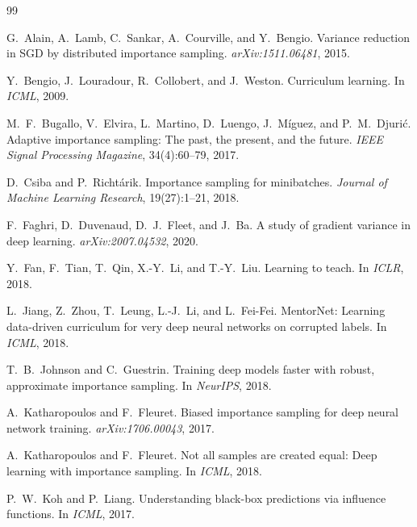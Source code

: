 \documentclass[11pt]{article}
\begin{document}
\begin{thebibliography}{99}

G.~Alain, A.~Lamb, C.~Sankar, A.~Courville, and Y.~Bengio.
\newblock Variance reduction in SGD by distributed importance sampling.
\newblock \emph{arXiv:1511.06481}, 2015.

Y.~Bengio, J.~Louradour, R.~Collobert, and J.~Weston.
\newblock Curriculum learning.
\newblock In \emph{ICML}, 2009.

M.~F.~Bugallo, V.~Elvira, L.~Martino, D.~Luengo, J.~M\'iguez, and P.~M.~Djuri\'c.
\newblock Adaptive importance sampling: The past, the present, and the future.
\newblock \emph{IEEE Signal Processing Magazine}, 34(4):60--79, 2017.

D.~Csiba and P.~Richt\'arik.
\newblock Importance sampling for minibatches.
\newblock \emph{Journal of Machine Learning Research}, 19(27):1--21, 2018.

F.~Faghri, D.~Duvenaud, D.~J.~Fleet, and J.~Ba.
\newblock A study of gradient variance in deep learning.
\newblock \emph{arXiv:2007.04532}, 2020.

Y.~Fan, F.~Tian, T.~Qin, X.-Y.~Li, and T.-Y.~Liu.
\newblock Learning to teach.
\newblock In \emph{ICLR}, 2018.

L.~Jiang, Z.~Zhou, T.~Leung, L.-J.~Li, and L.~Fei-Fei.
\newblock MentorNet: Learning data-driven curriculum for very deep neural
networks on corrupted labels.
\newblock In \emph{ICML}, 2018.

T.~B.~Johnson and C.~Guestrin.
\newblock Training deep models faster with robust, approximate importance
sampling.
\newblock In \emph{NeurIPS}, 2018.

A.~Katharopoulos and F.~Fleuret.
\newblock Biased importance sampling for deep neural network training.
\newblock \emph{arXiv:1706.00043}, 2017.

A.~Katharopoulos and F.~Fleuret.
\newblock Not all samples are created equal: Deep learning with importance
sampling.
\newblock In \emph{ICML}, 2018.

P.~W.~Koh and P.~Liang.
\newblock Understanding black-box predictions via influence functions.
\newblock In \emph{ICML}, 2017.


\end{thebibliography}
\end{document}
